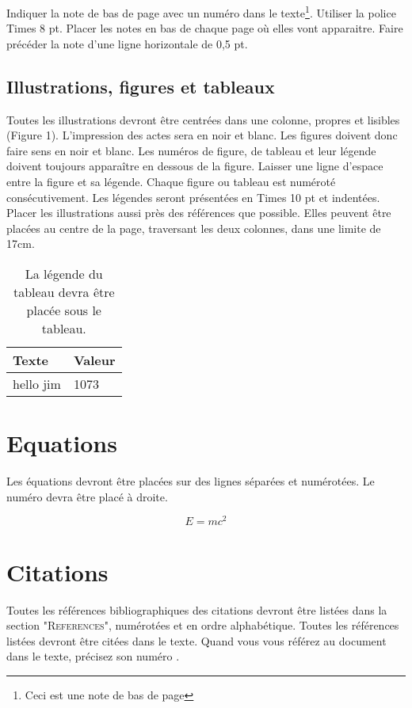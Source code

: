 \documentclass{article}
\begin{document}
Indiquer la note de bas de page avec un numéro dans le texte\footnote{Ceci est une note de bas de page}.  Utiliser la police Times 8 pt. Placer les notes en bas de chaque page où elles vont apparaitre. Faire précéder la note d'une ligne horizontale de 0,5 pt.

\subsection{Illustrations, figures et tableaux}

Toutes les illustrations devront être centrées dans une colonne, propres et lisibles (Figure 1). L'impression des actes sera en noir et blanc. Les figures doivent donc faire sens en noir et blanc. Les numéros de figure, de tableau et leur légende doivent toujours apparaître en dessous de la figure. Laisser une ligne d'espace entre la figure et sa légende. Chaque figure ou tableau est numéroté consécutivement. Les légendes seront présentées en Times 10 pt et indentées. Placer les illustrations aussi près des références que possible. Elles peuvent être placées au centre de la page, traversant les deux colonnes, dans une limite de 17cm.

\begin{table}
\begin{center}
\begin{tabular}{|l|l|}
\hline
Texte & Valeur \\
\hline
hello jim  & 1073 \\
\hline
\end{tabular}
\end{center}
\caption{La légende du tableau devra être placée sous le tableau.}
\label{tab:example}
\end{table}


\section{Equations}

Les équations devront être placées sur des lignes séparées et numérotées. Le numéro devra être placé à droite.

\begin{equation}
E=mc^{2}
\end{equation}

\section{Citations}

Toutes les références bibliographiques des citations devront être listées dans la section "\textsc{References}", numérotées et en ordre alphabétique. Toutes les références  listées devront être citées dans le texte. Quand  vous vous référez au document dans le texte, précisez son numéro \cite{Author:00}.


\end{document}
